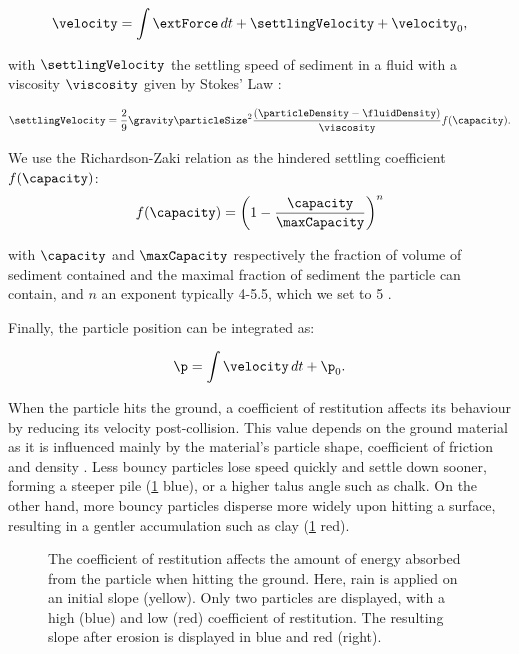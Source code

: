\begin{align}
    \label{eq:erosion-velocity-computation}
    \velocity = \int{ \extForce \, dt} + \settlingVelocity + \velocity_0,
\end{align}

with $\settlingVelocity$ the settling speed of sediment in a fluid with a viscosity $\viscosity$ given by Stokes' Law \cite{Stokes1850}: 

\begin{align} 
    \label{eq:erosion-initialSettlingVelocity}
    \settlingVelocity = \frac{ 2 }{ 9 }  \gravity \particleSize^2 \frac{(\particleDensity - \fluidDensity)}{\viscosity } f(\capacity).
\end{align} 

We use the Richardson-Zaki relation as the hindered settling coefficient $f(\capacity)$: 
\begin{align}
    \label{eq:erosion-Richardson}
    f(\capacity) = \left( 1 - \frac{\capacity}{ \maxCapacity } \right)^{n}
\end{align}

with $\capacity$ and $\maxCapacity$ respectively the fraction of volume of sediment contained and the maximal fraction of sediment the particle can contain, and $n$ an exponent typically 4-5.5, which we set to 5 \cite{Richardson1954, Wojtan2007}.

Finally, the particle position can be integrated as: 

\begin{align*}
    \p = \int{ \velocity \, dt} + \p_0.
\end{align*}

When the particle hits the ground, a coefficient of restitution affects its behaviour by reducing its velocity post-collision. This value depends on the ground material as it is influenced mainly by the material's particle shape, coefficient of friction and density \cite{Yan2020}. Less bouncy particles lose speed quickly and settle down sooner, forming a steeper pile (\cref{fig:erosion-coefficient of restitution-diagram} blue), or a higher talus angle such as chalk. On the other hand, more bouncy particles disperse more widely upon hitting a surface, resulting in a gentler accumulation such as clay (\cref{fig:erosion-coefficient of restitution-diagram} red).


\begin{figure}
    \caption{The coefficient of restitution affects the amount of energy absorbed from the particle when hitting the ground. Here, rain is applied on an initial slope (yellow). Only two particles are displayed, with a high (blue) and low (red) coefficient of restitution. The resulting slope after erosion is displayed in blue and red (right).}
    \label{fig:erosion-coefficient of restitution-diagram}
\end{figure}

